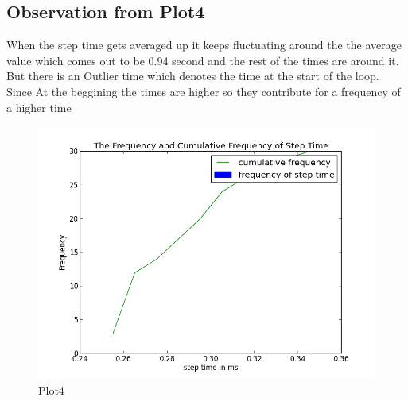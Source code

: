 \documentclass[11pt]{article}
\begin{document}
\subsection{Observation from Plot4}
When the step time gets averaged up it keeps fluctuating around the the average value which comes out to be 
0.94 second and the rest of the times are around it.\\

But there is an Outlier time which denotes the time at the start of the loop. Since  At the beggining the times are higher so they 
contribute for a frequency of a higher time
\begin{figure}[!ht]
	\centering
	\caption{Plot4}
		\includegraphics[scale=0.5]{../plots/g17_plot04.png}
\end{figure}
\end{document}
